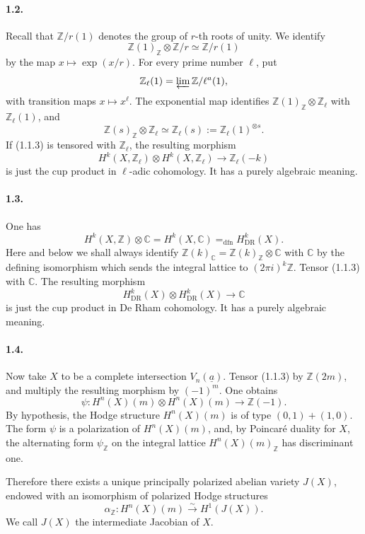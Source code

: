 \documentclass[10pt]{article}
\newcommand{\C}{\mathbb C}
\newcommand{\Z}{\mathbb Z}
\newcommand{\DR}{\mathrm{DR}}
\newcommand{\iso}{\xrightarrow{\sim}}
\begin{document}
\paragraph{1.2.} Recall that \(\Z/r(1)\) denotes the group of \(r\)-th roots of unity. We identify
\[
\Z(1)_\Z\otimes\Z/r \simeq \Z/r(1)
\]
by the map \(x\mapsto\exp(x/r)\). For every prime number \(\ell\), put
\[
\Z_\ell(1)=\varprojlim \Z/\ell^a(1),
\]
with transition maps \(x\mapsto x^\ell\). The exponential map identifies \(\Z(1)_\Z\otimes\Z_\ell\) with \(\Z_\ell(1)\), and
\[
\Z(s)_\Z\otimes\Z_\ell\simeq \Z_\ell(s):=\Z_\ell(1)^{\otimes s}.
\]
If (1.1.3) is tensored with \(\Z_\ell\), the resulting morphism
\[
\tag{1.2.1}
H^k(X,\Z_\ell)\otimes H^k(X,\Z_\ell)\longrightarrow\Z_\ell(-k)
\]
is just the cup product in \(\ell\)-adic cohomology. It has a purely algebraic meaning.

\paragraph{1.3.} One has
\[
\tag{1.3.1}
H^k(X,\Z)\otimes\C=H^k(X,\C)=_{\mathrm{dfn}}H^k_{\DR}(X).
\]
Here and below we shall always identify \(\Z(k)_\C=\Z(k)_\Z\otimes\C\) with \(\C\) by the defining isomorphism which sends the integral lattice to \((2\pi i)^k\Z\). Tensor (1.1.3) with \(\C\). The resulting morphism
\[
\tag{1.3.2}
H^k_{\DR}(X)\otimes H^k_{\DR}(X)\longrightarrow\C
\]
is just the cup product in De Rham cohomology. It has a purely algebraic meaning.

\paragraph{1.4.} Now take \(X\) to be a complete intersection \(V_n(\underline a)\). Tensor (1.1.3) by \(\Z(2m)\), and multiply the resulting morphism by \((-1)^m\). One obtains
\[
\tag{1.4.1}
\psi:H^n(X)(m)\otimes H^n(X)(m)\longrightarrow\Z(-1).
\]
By hypothesis, the Hodge structure \(H^n(X)(m)\) is of type \((0,1)+(1,0)\). The form \(\psi\) is a polarization of \(H^n(X)(m)\), and, by Poincaré duality for \(X\), the alternating form \(\psi_\Z\) on the integral lattice \(H^n(X)(m)_\Z\) has discriminant one.

Therefore there exists a unique principally polarized abelian variety \(J(X)\), endowed with an isomorphism of polarized Hodge structures
\[
\alpha_\Z:H^n(X)(m)\iso H^1(J(X)).
\]
We call \(J(X)\) the intermediate Jacobian of \(X\).
\end{document}

